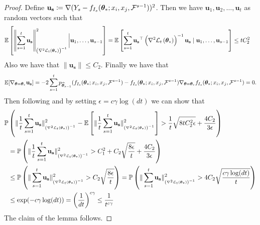 \begin{proof}
Define $\mathbf{u_s} \coloneqq \nabla (Y_s -f_{I_s}(\bm{\theta}_*; x_i, x_j, \mathcal{F}^{s-1}))^2$. Then we have $\mathbf{u}_{1}, \mathbf{u}_{2}, \ldots, \mathbf{u}_{t}$ as random vectors such that
\begin{align*}
    & \mathbb{E}\left[\left\|\sum_{s=1}^t \mathbf{u_s}\right\|_{\left(\nabla^{2} {\cal L}_t\left(\bm{\theta}_{*}\right)\right)^{-1}}^{2} \bigg | \mathbf{u}_{1}, \ldots, \mathbf{u}_{s-1}\right] = \mathbb{E}\left[\sum_{s=1}^t \mathbf{u_s}^{\top}\left(\nabla^{2} {\cal L}_t\left(\bm{\theta}_{*}\right)\right)^{-1}\mathbf{u_s} \mid \mathbf{u}_{1}, \ldots, \mathbf{u}_{s-1}\right] \leq t C^2_2
\end{align*}
Also we have that $\|\mathbf{u_s}\| \leq C_2$. Finally we have that 
\begin{align*}
    \mathbb{E}[\nabla_{\bm{\theta} = \bm{\theta}_*}\mathbf{u_s}] = -2\sum_{s=1}^{t} p_{{\widehat{\bm{\theta}}}_{s-1}}(f_{I_s}(\bm{\theta}_*; x_i, x_j, \mathcal{F}^{s-1}) - f_{I_s}(\bm{\theta}_*; x_i, x_j, \mathcal{F}^{s-1})\nabla_{\bm{\theta} = \bm{\theta}_*}f_{I_s}(\bm{\theta}_*; x_i, x_j, \mathcal{F}^{s-1}) = 0.
\end{align*}
Then following  and by setting $\epsilon = c\gamma\log(dt)$ we can show that
\begin{align*}
    \mathbb{P}&\left(\|\frac{1}{t}\sum_{s=1}^t \mathbf{u_s}\|^2_{_{\left(\nabla^{2} {\cal L}_{t}\left(\bm{\theta}_{*}\right)\right)^{-1}}} - \mathbb{E}\left[\|\frac{1}{t}\sum_{s=1}^t \mathbf{u_s}\|^2_{_{\left(\nabla^{2} {\cal L}_{t}\left(\bm{\theta}_{*}\right)\right)^{-1}}}\right] >  \frac{1}{t}\sqrt{8tC_2^2 \epsilon} + \dfrac{4 C_2 }{3\epsilon}   \right) \\
    &= \mathbb{P}\left(\|\frac{1}{t}\sum_{s=1}^t \mathbf{u_s}\|^2_{_{\left(\nabla^{2} {\cal L}_{t}\left(\bm{\theta}_{*}\right)\right)^{-1}}} >  C_1^2 +  C_2\sqrt{\frac{8\epsilon}{t}} + \dfrac{4 C_2 }{3\epsilon}   \right)\\
    &\leq \mathbb{P}\left(\|\sum_{s=1}^t \mathbf{u_s}\|^2_{_{\left(\nabla^{2} {\cal L}_{t}\left(\bm{\theta}_{*}\right)\right)^{-1}}} >  C_2\sqrt{\frac{8\epsilon}{t}}  \right) = \mathbb{P}\left(\|\sum_{s=1}^t \mathbf{u_s}\|^2_{_{\left(\nabla^{2} {\cal L}_{t}\left(\bm{\theta}_{*}\right)\right)^{-1}}} >  4C_2\sqrt{\dfrac{  c\gamma \log(dt)}{t}}  \right)\\
    &\leq \exp(- c\gamma\log (dt)) = \left(\frac{1}{dt}\right)^{c\gamma} \leq \frac{1}{t^{c\gamma}}
\end{align*}
The claim of the lemma follows.
\end{proof}

